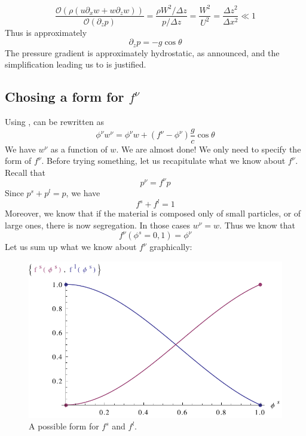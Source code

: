 \documentclass[11pt]{book}
\newcommand{\om}[1]{\ensuremath{ \mathcal{O} \left( {#1} \right) }}
\begin{document}
\begin{equation}
	\frac{\om{ \rho \left( u \partial_x w + w \partial_z w \right) }}{\om{\partial_z p}} = \frac{ \rho W^2/\Delta z}{p/\Delta z} = \frac{W^2}{U^2} = \frac{\Delta z^2}{\Delta x^2} \ll 1
\end{equation}
Thus \cite{eq:z_momentum} is approximately
\begin{equation} \label{eq:pressure_grad}
	\partial_z p = - g \cos \theta
\end{equation}
The pressure gradient is approximately hydrostatic, as announced, and the simplification leading us to \cite{eq:z_proj} is justified.

\subsection{Chosing a form for $f^\nu$}

Using \cite{eq:1},  \cite{eq:z_proj} can be rewritten as
\begin{equation} \label{eq:w}
	\phi^\nu w^\nu = \phi^\nu w + (f^\nu - \phi^\nu) \frac{g}{c} \cos \theta
\end{equation}
We have $w^\nu$ as a function of $w$. We are almost done! We only need to specify the form of $f^\nu$.
Before trying something, let us recapitulate what we know about $f^\nu$. 
Recall that 
\begin{equation}
	p^\nu = f^\nu p
\end{equation}
Since $p^s + p ^l = p$, we have
\begin{equation}
	f^s + f^l = 1
\end{equation}
Moreover, we know that if the material is composed only of small particles, or of large ones, there is now segregation. In those cases $w^\nu = w$. Thus we know that
\begin{equation}
f^\nu(\phi^s = 0, 1) = \phi^\nu
\end{equation}
Let us sum up what we know about $f^\nu$ graphically:
\begin{figure}[htp] \label{fig:1}
\centering
\includegraphics[scale=0.9]{f_form.pdf}
\caption{A possible form for $f^s$ and  $f^l$.}
\label{}
\end{figure}
\end{document}
